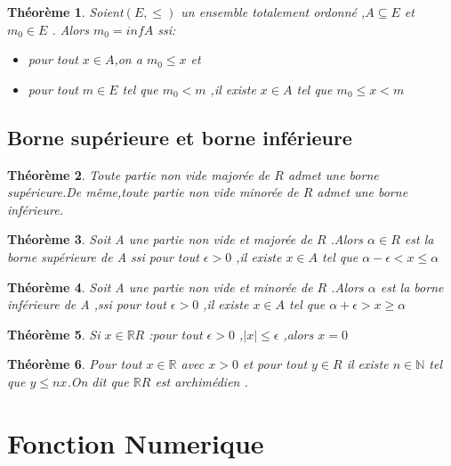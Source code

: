 \documentclass[a4paper,12pt]{article} %
\newtheorem{theoreme}{Théorème}[section]
\begin{document}
		\begin{theoreme}
		Soient$(E,\leq)$ un ensemble totalement ordonné ,$A\subseteq E$ et $m_0 \in E$ .
		Alors $m_0=infA$ ssi:
		\begin{itemize}
			\item pour tout $x\in A$,on a $m_0\leq x$ et
			\item pour tout $m\in E$ tel que $m_0<m$ ,il existe $x\in A$ tel que $m_0\leq x<m$
		\end{itemize}
		\end{theoreme}
	
	\subsection{Borne supérieure et borne inférieure}
	\begin{theoreme}
		Toute partie non vide majorée de $R$ admet une borne supérieure.De même,toute partie non vide minorée de $R$ admet une borne inférieure. 
	\end{theoreme}
	\begin{theoreme}
		Soit A une partie non vide et majorée de $R$ .Alors $ \alpha \in R$ est  la borne supérieure de A ssi  pour tout $ \epsilon > 0$ ,il existe $x \in A$ tel que $\alpha -\epsilon<x\leq \alpha $
	\end{theoreme}
	\begin{theoreme}
		Soit A une partie non vide et minorée de $R$ .Alors $ \alpha$ est la borne inférieure de A ,ssi pour tout $\epsilon > 0$ ,il existe $x \in A $ tel que $ \alpha + \epsilon >x\geq \alpha$
	\end{theoreme}
	
	 \begin{theoreme}
	 	Si $x \in \mathbb{R}R$ :pour tout $\epsilon > 0$ ,$|x| \leq \epsilon $ ,alors $x=0$ 
	 \end{theoreme}
	 \begin{theoreme}
	 	Pour tout $x \in \mathbb{R}$ avec $x >0$ et pour tout $y \in R$ il existe $n \in \mathbb{N}$ tel que $y\leq nx$.On dit que $\mathbb{R}R$ est archimédien .
	\end{theoreme}

	
	\section{Fonction Numerique}
\end{document}
